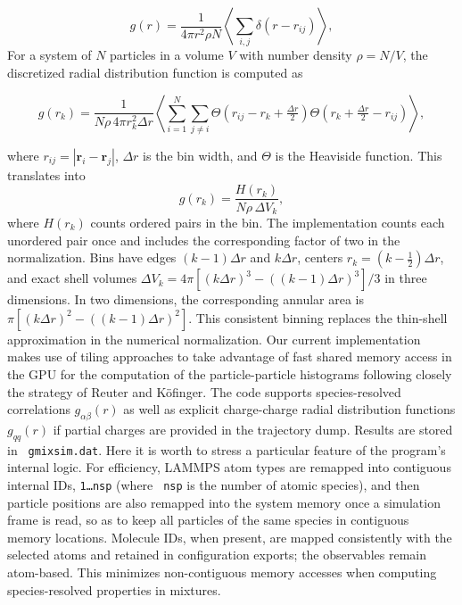\documentclass[final,1p,times]{elsarticle}
\begin{document}
\begin{equation}
g(r)=\frac{1}{4\pi r^2\rho N}
\left\langle \sum_{i,j}\delta(r-r_{ij}) \right\rangle ,
\end{equation}
For a system of $N$ particles in a volume $V$ with number density $\rho = N/V$, the discretized radial distribution function is computed as

\begin{equation}
g(r_k) = \frac{1}{N \rho \, 4\pi r_k^2 \Delta r}
\left\langle \sum_{i=1}^{N} \sum_{j \ne i}
\Theta(r_{ij} - r_k + \tfrac{\Delta r}{2})
\Theta(r_k + \tfrac{\Delta r}{2} - r_{ij})
\right\rangle ,
\end{equation}

where $r_{ij} = |\mathbf{r}_i - \mathbf{r}_j|$, $\Delta r$ is the bin width, and $\Theta$ is the Heaviside function. This translates into
\begin{equation}
g(r_k) = \frac{H(r_k)}{N \rho \, \Delta V_k},
\end{equation}
where $H(r_k)$ counts ordered pairs in the bin. The implementation
counts each unordered pair once and includes the corresponding factor
of two in the normalization. Bins have edges $(k-1)\Delta r$ and
$k\Delta r$, centers $r_k=(k-\tfrac12)\Delta r$, and exact shell
volumes $\Delta V_k=4\pi[(k\Delta r)^3-((k-1)\Delta r)^3]/3$ in
three dimensions. In two dimensions, the corresponding annular area
is $\pi[(k\Delta r)^2-((k-1)\Delta r)^2]$. This consistent binning
replaces the thin-shell approximation in the numerical normalization. Our current
implementation makes use of tiling approaches to take advantage of
fast shared memory access in the GPU for the computation of the
particle-particle histograms following closely the strategy of Reuter
and Köfinger\cite{Reuter2019}. The code supports species-resolved
correlations $g_{\alpha\beta}(r)$ as well as explicit charge-charge
radial distribution functions $g_{qq}(r)$ if partial charges are
provided in the trajectory dump. Results are stored in {\tt
  gmixsim.dat}. Here it is worth to stress a particular feature of the
program's internal logic. For efficiency, LAMMPS atom types  are
remapped into contiguous internal IDs, {\tt 1\ldots nsp} (where {\tt
  nsp} is the number of atomic species), and then particle positions
are also remapped into the system memory once a simulation frame is
read, so as to keep all particles of the same species in contiguous
memory locations. Molecule IDs, when present, are mapped consistently with the selected atoms and retained in configuration exports; the observables remain atom-based. This minimizes non-contiguous memory accesses when
computing species-resolved properties in mixtures. 
\end{document}
